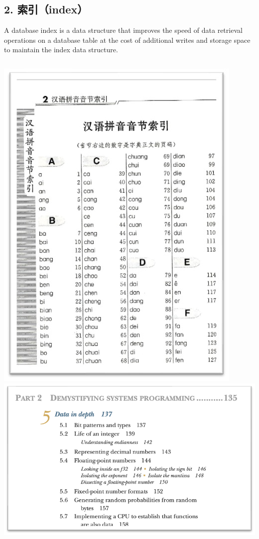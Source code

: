 \documentclass[aspectratio=169, 14pt]{beamer}
\begin{document}
\begin{frame}
	\section{\textcolor{darkmidnightblue}{2. 索引（index）}}
	A database index is a data structure that improves the speed of data retrieval operations on a database table at the cost of additional writes and storage space to maintain the index data structure.
\end{frame}

\begin{frame}
	\begin{columns}
		\includegraphics[width=.8\textwidth]{week11/dict}
		\includegraphics[width=.99\textwidth]{week11/book}
	\end{columns}
\end{frame}
\end{document}
